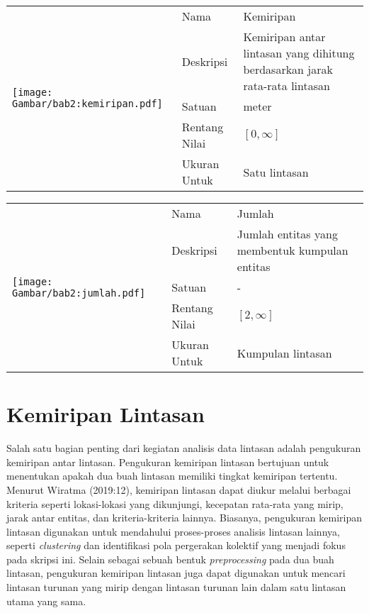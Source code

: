 \begin{table}[h!]
    \centering
    \begin{tabular}{|m{4cm}|l|p{8cm}|} 
        \hline
        \multirow{5}{*}{
            \texttt{[image: Gambar/bab2:kemiripan.pdf]}
        } & Nama & Kemiripan \\ 
        \cline{2-3}
        & Deskripsi & Kemiripan antar lintasan yang dihitung berdasarkan jarak rata-rata lintasan                     \\ 
        \cline{2-3}
        & Satuan & meter                   \\ 
        \cline{2-3}
        & Rentang Nilai & $[0, \infty]$                    \\ 
        \cline{2-3}
        & Ukuran Untuk & Satu lintasan                    \\
        \hline
    \end{tabular}
\end{table}

\begin{table}[t!]
    \centering
    \begin{tabular}{|m{4cm}|l|p{8cm}|} 
        \hline
        \multirow{5}{*}{
            \texttt{[image: Gambar/bab2:jumlah.pdf]}
        } & Nama & Jumlah \\ 
        \cline{2-3}
        & Deskripsi & Jumlah entitas yang membentuk kumpulan entitas                     \\ 
        \cline{2-3}
        & Satuan & -                   \\ 
        \cline{2-3}
        & Rentang Nilai & $[2, \infty]$                    \\ 
        \cline{2-3}
        & Ukuran Untuk & Kumpulan lintasan                    \\
        \hline
    \end{tabular}
\end{table}

\section{Kemiripan Lintasan}
\label{sec:kemiripan}

Salah satu bagian penting dari kegiatan analisis data lintasan adalah pengukuran kemiripan antar lintasan. Pengukuran kemiripan lintasan bertujuan untuk menentukan apakah dua buah lintasan memiliki tingkat kemiripan tertentu. Menurut Wiratma (2019:12), kemiripan lintasan dapat diukur melalui berbagai kriteria seperti lokasi-lokasi yang dikunjungi, kecepatan rata-rata yang mirip, jarak antar entitas, dan kriteria-kriteria lainnya. Biasanya, pengukuran kemiripan lintasan digunakan untuk mendahului proses-proses analisis lintasan lainnya, seperti \textit{clustering} dan identifikasi pola pergerakan kolektif yang menjadi fokus pada skripsi ini. Selain sebagai sebuah bentuk \textit{preprocessing} pada dua buah lintasan, pengukuran kemiripan lintasan juga dapat digunakan untuk mencari lintasan turunan yang mirip dengan lintasan turunan lain dalam satu lintasan utama yang sama.


